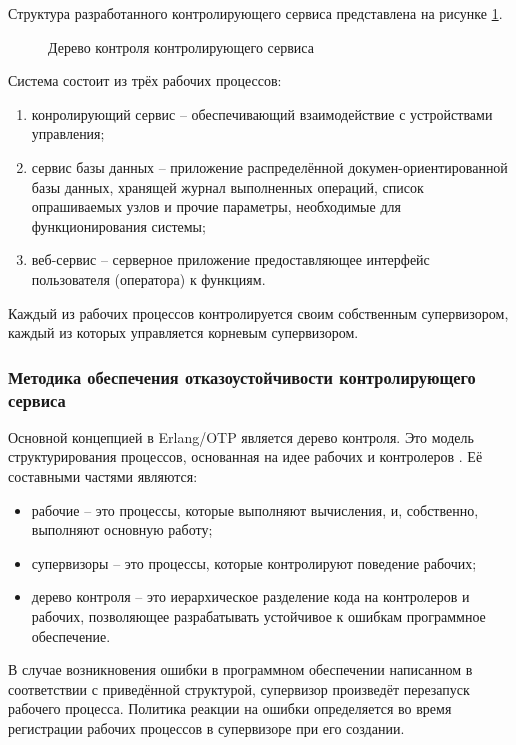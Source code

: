 Структура разработанного контролирующего сервиса представлена на рисунке \ref{img:otpStruct}.
\begin{figure}[ht]
	\caption{Дерево контроля контролирующего сервиса}
	\label{img:otpStruct}
\end{figure}

Система состоит из трёх рабочих процессов:
\begin{enumerate}
	\item конролирующий сервис -- обеспечивающий взаимодействие с устройствами управления;
	\item сервис базы данных -- приложение распределённой докумен-ориентированной базы данных,
	хранящей журнал выполненных операций, список опрашиваемых узлов и прочие параметры,
	необходимые для функционирования системы;
	\item веб-сервис -- серверное приложение предоставляющее интерфейс пользователя (оператора)
	к функциям.
\end{enumerate}

Каждый из рабочих процессов контролируется своим собственным супервизором, каждый из которых управляется
корневым супервизором.


\subsubsection{Методика обеспечения отказоустойчивости контролирующего сервиса}
Основной концепцией в Erlang/OTP является дерево контроля. Это модель структурирования процессов,
основанная на идее рабочих и контролеров \cite{otpOv}. Её составными частями являются:

\begin{itemize}
	\item рабочие -- это процессы, которые выполняют вычисления, и, собственно, выполняют основную работу;
	\item супервизоры -- это процессы, которые контролируют поведение рабочих;
	\item дерево контроля -- это иерархическое разделение кода на контролеров и рабочих,
		позволяющее разрабатывать устойчивое к ошибкам программное обеспечение.
\end{itemize}

В случае возникновения ошибки в программном обеспечении написанном в соответствии с приведённой структурой,
супервизор произведёт перезапуск рабочего процесса. Политика реакции на ошибки определяется во время регистрации
рабочих процессов в супервизоре при его создании.

